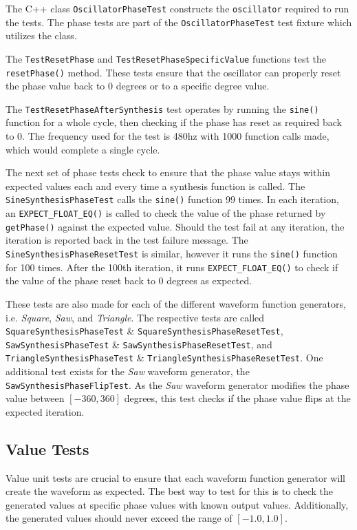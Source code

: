 \documentclass[a4paper,12pt]{report}
\begin{document}
The C++ class \texttt{OscillatorPhaseTest} constructs the \texttt{oscillator} required to run the tests. The phase tests are part of the \texttt{OscillatorPhaseTest} test fixture which utilizes the class.

The \texttt{TestResetPhase} and \texttt{TestResetPhaseSpecificValue} functions test the \texttt{resetPhase()} method. These tests ensure that the oscillator can properly reset the phase value back to 0 degrees or to a specific degree value.

The \texttt{TestResetPhaseAfterSynthesis} test operates by running the \texttt{sine()} function for a whole cycle, then checking if the phase has reset as required back to 0. The frequency used for the test is 480hz with 1000 function calls made, which would complete a single cycle.

The next set of phase tests check to ensure that the phase value stays within expected values each and every time a synthesis function is called. The \texttt{SineSynthesisPhaseTest} calls the \texttt{sine()} function 99 times. In each iteration, an \texttt{EXPECT\_FLOAT\_EQ()} is called to check the value of the phase returned by \texttt{getPhase()} against the expected value. Should the test fail at any iteration, the iteration is reported back in the test failure message. The \texttt{SineSynthesisPhaseResetTest} is similar, however it runs the \texttt{sine()} function for 100 times. After the 100th iteration, it runs \texttt{EXPECT\_FLOAT\_EQ()} to check if the value of the phase reset back to 0 degrees as expected.

These tests are also made for each of the different waveform function generators, i.e. \emph{Square}, \emph{Saw}, and \emph{Triangle}. The respective tests are called \texttt{SquareSynthesisPhaseTest} \& \texttt{SquareSynthesisPhaseResetTest}, \texttt{SawSynthesisPhaseTest} \& \texttt{SawSynthesisPhaseResetTest}, and \texttt{TriangleSynthesisPhaseTest} \& \texttt{TriangleSynthesisPhaseResetTest}. One additional test exists for the \emph{Saw} waveform generator, the \texttt{SawSynthesisPhaseFlipTest}. As the \emph{Saw} waveform generator modifies the phase value between $[-360,360]$ degrees, this test checks if the phase value flips at the expected iteration.

\subsection{Value Tests}
\label{subsec:valuetests}
Value unit tests are crucial to ensure that each waveform function generator will create the waveform as expected. The best way to test for this is to check the generated values at specific phase values with known output values. Additionally, the generated values should never exceed the range of $[-1.0,1.0]$.
\end{document}
